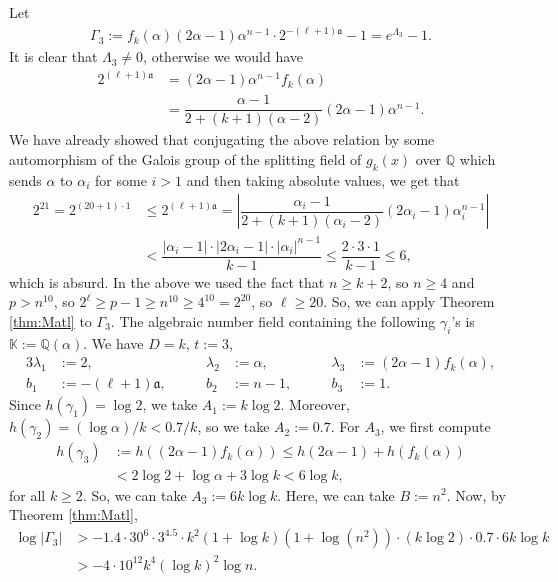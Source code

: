 \documentclass[11pt,a4paper]{article}
\numberwithin{equation}{section}
\numberwithin{table}{section}
\numberwithin{figure}{section}
\begin{document}
Let 
\begin{align*}
	\Gamma_3:=f_k(\alpha)(2\alpha - 1)\alpha^{n - 1}\cdot 2^{-(\ell+1)\mathfrak{a}}-1=e^{\Lambda_3}-1.
\end{align*} 
It is clear that $\Lambda_3\ne 0$, otherwise we would have
\begin{align*}
	2^{(\ell+1)\mathfrak{a}} &= (2\alpha-1)\alpha^{n-1}f_k(\alpha)\nonumber\\
	&=\dfrac{\alpha-1}{2+(k+1)(\alpha-2)}	(2\alpha-1)\alpha^{n-1}.
\end{align*}
We have already showed that conjugating the above relation by some automorphism of the Galois group of the splitting field of $g_k (x)$ over $\mathbb{Q}$ which sends $\alpha$ to $\alpha_i$ for some $i>1$ and then taking absolute values, we get that 
\begin{align*}
	2^{21}= 2^{(20+1)\cdot 1}&\le 2^{(\ell+1)\mathfrak{a}}=\left|\dfrac{\alpha_i-1}{2+(k+1)(\alpha_i-2)}(2\alpha_i-1)	\alpha_i^{n-1}\right| \\
	&< \dfrac{|\alpha_i-1|\cdot|2\alpha_i-1|\cdot |\alpha_i|^{n-1}}{k-1}\le\dfrac{2\cdot 3\cdot 1}{k-1}
	\le 6,
\end{align*} 
which is absurd.  In the above we used the fact that $n\ge k+2$, so $n\ge 4$ and $p>n^{10}$, so $2^{\ell}\ge p-1\ge n^{10}\ge 4^{10}=2^{20}$, so $\ell\ge 20$. So, we can apply Theorem \ref{thm:Matl} to $\Gamma_3$. The algebraic number field containing the following $\gamma_i$'s is $\mathbb{K} := \mathbb{Q}(\alpha)$. We have $D = k$, $t := 3$,
\begin{alignat*}{3}
	\lambda_{1} &:= 2,         &\qquad \lambda_{2} &:= \alpha,         &\qquad \lambda_{3} &:= (2\alpha-1)f_k(\alpha),      \\
	b_1         &:= -(\ell+1)\mathfrak{a},        &\qquad b_2    &:= n-1,         &\qquad b_3    &:= 1.
\end{alignat*}
Since $h(\gamma_{1})= \log 2$, we take $A_1:=k \log 2$. Moreover, $h(\gamma_{2}) =(\log \alpha)/k <0.7/k$, so we take $A_{2}:=0.7$.
For $A_3$, we first compute 
\begin{align*}
	h(\gamma_{3})&:=h\left((2\alpha-1)f_k(\alpha)\right)
	\le h\left(2\alpha-1\right)+h\left(f_k(\alpha)\right)\\
	&< 2\log 2+\log \alpha+3\log k
	<6\log k,
\end{align*}
for all $k\ge 2$. So, we can take $A_3:=6 k\log k$. Here, we can take $B:=n^2$. Now, by Theorem \ref{thm:Matl},
\begin{align}\label{eq:lin-g3}
	\log |\Gamma_3| &> -1.4\cdot 30^{6} \cdot 3^{4.5}\cdot k^2 (1+\log k)(1+\log (n^2))\cdot (k\log 2)\cdot 0.7\cdot 6k\log k\nonumber\\
	&> - 4\cdot 10^{12}k^4 (\log k)^2\log n.
\end{align}
\end{document}
